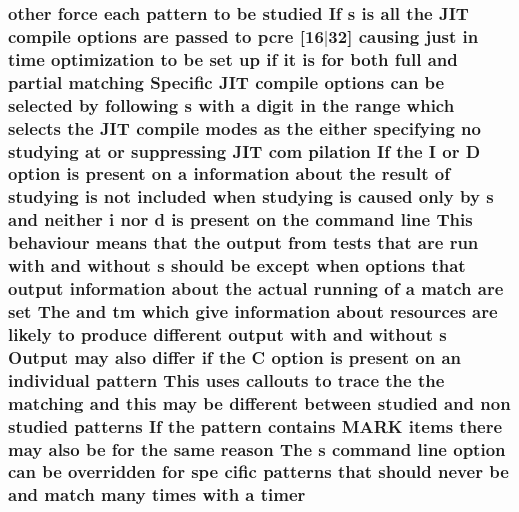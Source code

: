 \subsubsection[{\texorpdfstring{timer}{timer}}]{ other force each {\bf pattern} {\bf to} {\bf be} {\bf studied} If {\bf s} {\bf is} {\bf all} the J\+IT {\bf compile} {\bf options} {\bf are} passed {\bf to} {\bf pcre} \mbox{[}16$\vert$32\mbox{]} causing just {\bf in} {\bf time} optimization {\bf to} {\bf be} {\bf set} up {\bf if} {\bf it} {\bf is} for both full and {\bf partial} {\bf matching} Specific J\+IT {\bf compile} {\bf options} {\bf can} {\bf be} {\bf selected} by following {\bf s} {\bf with} {\bf a} digit {\bf in} the range {\bf which} selects the J\+IT {\bf compile} {\bf modes} {\bf as} the either {\bf specifying} no {\bf studying} at {\bf or} suppressing J\+IT com pilation If the {\bf I} {\bf or} {\bf D} {\bf option} {\bf is} {\bf present} {\bf on} {\bf a} information about the {\bf result} {\bf of} {\bf studying} {\bf is} {\bf not} {\bf included} when {\bf studying} {\bf is} caused only by {\bf s} and neither {\bf i} nor {\bf d} {\bf is} {\bf present} {\bf on} the {\bf command} {\bf line} This behaviour means that the {\bf output} {\bf from} {\bf tests} that {\bf are} {\bf run} {\bf with} and without {\bf s} should {\bf be} {\bf except} when {\bf options} that {\bf output} information about the actual running {\bf of} {\bf a} {\bf match} {\bf are} {\bf set} The and {\bf tm} {\bf which} give information about resources {\bf are} likely {\bf to} produce different {\bf output} {\bf with} and without {\bf s} Output may also differ {\bf if} the {\bf C} {\bf option} {\bf is} {\bf present} {\bf on} an individual {\bf pattern} This uses callouts {\bf to} trace the the {\bf matching} and {\bf this} may {\bf be} different between {\bf studied} and non {\bf studied} {\bf patterns} If the {\bf pattern} {\bf contains} M\+A\+RK items there may also {\bf be} for the same {\bf reason} The {\bf s} {\bf command} {\bf line} {\bf option} {\bf can} {\bf be} overridden for spe cific {\bf patterns} that should never {\bf be} and {\bf match} many {\bf times} {\bf with} {\bf a} timer}\hypertarget{pcretest_8txt_ae70b04879403340d2806d7149901fec9}{}\label{pcretest_8txt_ae70b04879403340d2806d7149901fec9}
